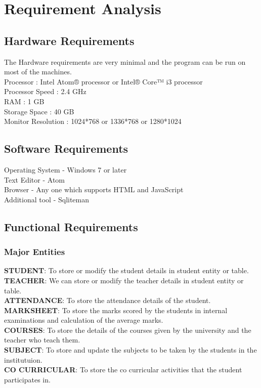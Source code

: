 \chapter{Requirement Analysis}

\section{Hardware Requirements}
The Hardware requirements are very minimal and the program can be run on most of
the machines. \\
Processor : Intel Atom® processor or Intel® Core™ i3 processor\\
Processor Speed : 2.4 GHz\\
RAM : 1 GB\\
Storage Space : 40 GB\\
Monitor Resolution : 1024*768 or 1336*768 or 1280*1024\\
\thispagestyle{fancy}

\section{Software Requirements}
Operating System - Windows 7 or later\\
Text Editor - Atom\\
Browser - Any one which supports HTML and JavaScript\\
Additional tool - Sqliteman\\
\thispagestyle{fancy}

\section{Functional Requirements}
\subsection{Major Entities}
\textbf{STUDENT}: To store or modify the student details in student entity or table.\\
\textbf{TEACHER}: We can store or modify the teacher details in student entity or table.\\
\textbf{ATTENDANCE}: To store the attendance details of the student.\\
\textbf{MARKSHEET}: To store the marks scored by the students in internal examinations and calculation of the average marks.\\
\textbf{COURSES}: To store the details of the courses given by the university and the teacher who teach them.\\
\textbf{SUBJECT}: To store and update the subjects to be taken by the students in the institutuion.\\
\textbf{CO CURRICULAR}: To store the co curricular activities that the student participates in.\\


